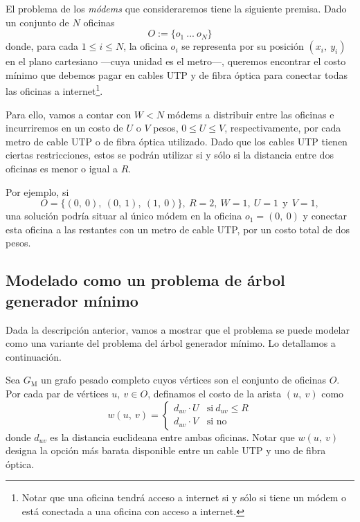 El problema de los \textit{módems} que consideraremos tiene la siguiente premisa. Dado un conjunto de $N$ oficinas 
\begin{equation*}
    O := \{o_1\ ...\ o_N\}    
\end{equation*}
donde, para cada $1 \leq i \leq N$, la oficina $o_i$ se representa por su posición $(x_i,\ y_i)$ en el plano cartesiano ---cuya unidad es el metro---, queremos encontrar el costo mínimo que debemos pagar en cables UTP y de fibra óptica para conectar todas las oficinas a internet\footnote{Notar que una oficina tendrá acceso a internet si y sólo si tiene un módem o está conectada a una oficina con acceso a internet.}.

Para ello, vamos a contar con $W < N$ módems a distribuir entre las oficinas e incurriremos en un costo de $U$ o $V$ pesos, $0 \leq U \leq V$, respectivamente, por cada metro de cable UTP o de fibra óptica utilizado. Dado que los cables UTP tienen ciertas restricciones, estos se podrán utilizar si y sólo si la distancia entre dos oficinas es menor o igual a $R$. 

Por ejemplo, si 
\begin{equation*}
     O = \{(0,\ 0),\ (0,\ 1),\ (1,\ 0)\},\ R = 2,\ W = 1,\ U = 1\ \: \text{y}\ \: V = 1, 
\end{equation*}
una solución podría situar al único módem en la oficina $o_1 = (0,\ 0)$ y conectar esta oficina a las restantes con un metro de cable UTP, por un costo total de dos pesos.

\subsection{Modelado como un problema de árbol generador mínimo}\label{modelo}

Dada la descripción anterior, vamos a mostrar que el problema se puede modelar como una variante del problema del árbol generador mínimo. Lo detallamos a continuación.

Sea $G_{\text{M}}$ un grafo pesado completo cuyos vértices son el conjunto de oficinas $O$. Por cada par de vértices $u,\ v \in O$, definamos el costo de la arista $(u,\ v)$ como
\begin{equation*}
    w(u,\ v) = \begin{cases}
        d_{uv} \cdot U &\text{si}\ d_{uv} \leq R \\
        d_{uv} \cdot V & \text{si no}
    \end{cases}
\end{equation*}
donde $d_{uv}$ es la distancia euclideana entre ambas oficinas. Notar que $w(u,\ v)$ designa la opción más barata disponible entre un cable UTP y uno de fibra óptica. 

